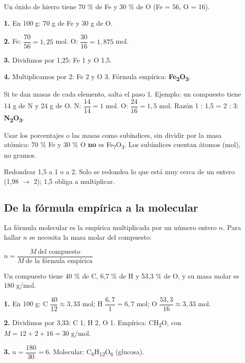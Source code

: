  
\begin{ejemplo} Un óxido de hierro tiene 70 \% de Fe y 30 \% de O (Fe = 56, O = 16).\par \textbf{1.} En 100 g: 70 g de Fe y 30 g de O.\par \textbf{2.} Fe: $\dfrac{70}{56} = 1{,}25$ mol. O: $\dfrac{30}{16} = 1{,}875$ mol.\par \textbf{3.} Dividimos por 1,25: Fe 1 y O 1,5.\par \textbf{4.} Multiplicamos por 2: Fe 2 y O 3. Fórmula empírica: \textbf{Fe\textsubscript{2}O\textsubscript{3}}.\end{ejemplo}
  
\begin{clave} Si te dan masas de cada elemento, salta el paso 1. Ejemplo: un compuesto tiene 14 g de N y 24 g de O. N: $\dfrac{14}{14} = 1$ mol. O: $\dfrac{24}{16} = 1{,}5$ mol. Razón 1 : 1,5 = 2 : 3: \textbf{N\textsubscript{2}O\textsubscript{3}}.\end{clave}
 
\begin{ojo} Usar los porcentajes o las masas como subíndices, sin dividir por la masa atómica: 70 \% Fe y 30 \% O \textbf{no} es Fe\textsubscript{7}O\textsubscript{3}. Los subíndices cuentan átomos (mol), no gramos.\end{ojo}
 
\begin{ojo} Redondear 1,5 a 1 o a 2. Solo se redondea lo que está muy cerca de un entero (1,98 \ensuremath{\rightarrow} 2); 1,5 obliga a multiplicar.\end{ojo}
\subsection{De la fórmula empírica a la molecular}
La fórmula molecular es la empírica multiplicada por un número entero $n$. Para hallar $n$ se necesita la masa molar del compuesto:

 
\begin{center}
$n = \dfrac{M\ \text{del compuesto}}{M\ \text{de la fórmula empírica}}$
\end{center}
 
\begin{ejemplo} Un compuesto tiene 40 \% de C, 6,7 \% de H y 53,3 \% de O, y su masa molar es 180 g/mol.\par \textbf{1.} En 100 g: C $\dfrac{40}{12}\approx 3{,}33$ mol; H $\dfrac{6{,}7}{1} = 6{,}7$ mol; O $\dfrac{53{,}3}{16}\approx 3{,}33$ mol.\par \textbf{2.} Dividimos por 3,33: C 1, H 2, O 1. Empírica: CH\textsubscript{2}O, con $M = 12 + 2 + 16 = 30$ g/mol.\par \textbf{3.} $n = \dfrac{180}{30} = 6$. Molecular: C\textsubscript{6}H\textsubscript{12}O\textsubscript{6} (glucosa).\end{ejemplo}
  
